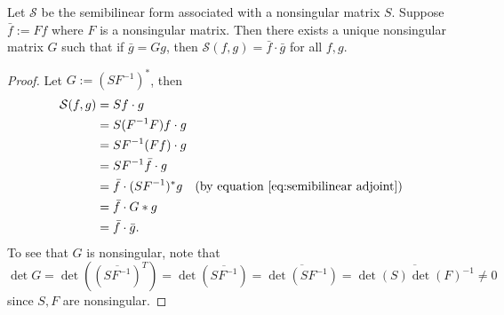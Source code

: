 \documentclass[12pt, oneside, a4paper]{article}
\begin{document}
\begin{prop}\cite[p.287]{CoddingtonLevinson}\label{prop:unique nonsingular G in semibilinear form}
    Let $\mathcal{S}$ be the semibilinear form associated with a nonsingular matrix $S$. Suppose $\bar{f}:=Ff$ where $F$ is a nonsingular matrix. Then there exists a unique nonsingular matrix $G$ such that if $\bar{g}=Gg$, then $\mathcal{S}(f,g)=\bar{f}\cdot \bar{g}$ for all $f, g$.
\end{prop}
\begin{proof}
    Let $G:=(SF^{-1})^*$, then
    \begin{align*}
        \mathcal{S}(f,g) &= Sf\cdot g\\
        &= S(F^{-1}F)f\cdot g\\
        &= SF^{-1}(Ff)\cdot g\\
        &= SF^{-1}\bar{f} \cdot g\\
        &= \bar{f}\cdot (SF^{-1})^*g \quad\mbox{(by equation \eqref{eq:semibilinear adjoint})}\\
        &= \bar{f}\cdot G*g\\
        &= \bar{f}\cdot \bar{g}.
    \end{align*}
    To see that $G$ is nonsingular, note that $\det G = \det((\overline{SF^{-1}})^T) = \det(\overline{SF^{-1}}) = \overline{\det(SF^{-1})} = \overline{\det(S)\det(F)^{-1}}\neq 0$ since $S, F$ are nonsingular.
\end{proof}
\end{document}
